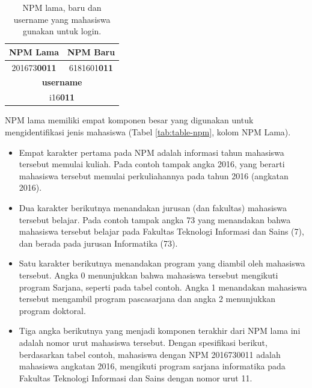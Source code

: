     \begin{table}[H]
        \centering
        \def\arraystretch{2}
        \begin{tabular}{|c|c|}
            \hline
            \textbf{NPM Lama} & \textbf{NPM Baru} \\
            \hline
            201673\textbf{0011} & 6181601\textbf{011} \\
            \hline
            \multicolumn{2}{|c|}{\textbf{username}} \\
            \hline
            \multicolumn{2}{|c|}{i16\textbf{011}} \\
            \hline
        \end{tabular}
        \caption{NPM lama, baru dan username yang mahasiswa gunakan untuk login.}
        \label{tab:table-npm-detail}
    \end{table}
    
    NPM lama memiliki empat komponen besar yang digunakan untuk mengidentifikasi
    jenis mahasiswa (Tabel \ref{tab:table-npm}, kolom NPM Lama). 
    \begin{itemize}
        \item Empat karakter pertama pada NPM adalah informasi tahun mahasiswa
        tersebut memulai kuliah. Pada contoh tampak angka 2016, yang berarti
        mahasiswa tersebut memulai perkuliahannya pada tahun 2016 (angkatan 2016). 
        
        \item Dua karakter berikutnya menandakan jurusan (dan fakultas) mahasiswa
        tersebut belajar. Pada contoh tampak angka 73 yang menandakan bahwa
        mahasiswa tersebut belajar pada Fakultas Teknologi Informasi dan Sains (7),
        dan berada pada jurusan Informatika (73). 
        
        \item Satu karakter berikutnya menandakan program yang diambil oleh
        mahasiswa tersebut. Angka 0 menunjukkan bahwa mahasiswa tersebut mengikuti
        program Sarjana, seperti pada tabel contoh. Angka 1 menandakan mahasiswa
        tersebut mengambil program pascasarjana dan angka 2 menunjukkan program
        doktoral. 
        
        \item Tiga angka berikutnya yang menjadi komponen terakhir dari NPM lama ini
        adalah nomor urut mahasiswa tersebut. Dengan spesifikasi berikut,
        berdasarkan tabel contoh, mahasiswa dengan NPM 2016730011 adalah mahasiswa
        angkatan 2016, mengikuti program sarjana informatika pada Fakultas Teknologi
        Informasi dan Sains dengan nomor urut 11.
    \end{itemize}
    
